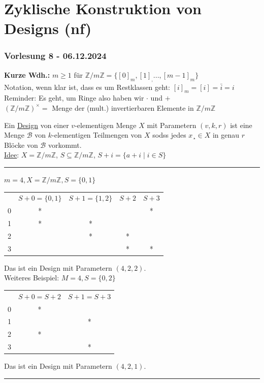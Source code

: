 \documentclass[9pt]{article}
\begin{document}
\section{Zyklische Konstruktion von Designs (nf)}
\subsubsection*{Vorlesung 8 - 06.12.2024}
\textbf{Kurze Wdh.:} $m \geq 1$ für $\mathbb{Z} / m \mathbb{Z} = \{[0]_m, [1]_, ..., [m-1]_m\}$ \\
Notation, wenn klar ist, dass es um Restklassen geht: $[i]_m = [i] = \bar{i} = i$ \\
Reminder: Es geht, um Ringe also haben wir $\cdot$ und $+$ \\
$(\mathbb{Z} / m \mathbb{Z})^{\times} = $ Menge der (mult.) invertierbaren Elemente in $\mathbb{Z} / m \mathbb{Z}$

Ein \underline{Design} von einer $v$-elementigen Menge $X$ mit Parametern $(v,k,r)$ ist eine Menge $\mathcal{B}$ von $k$-elementigen Teilmengen von $X$ sodss jedes $x ¸\in X$ in genau $r$ Blöcke von $\mathcal{B}$ vorkommt. \\
\underline{Idee}: $X = \mathbb{Z} / m \mathbb{Z}$, $S \subseteq \mathbb{Z} / m \mathbb{Z}$, $S+i = \{ a+i \mid i \in S\}$ \\
 \noindent \rule{8cm}{0.4pt} 
\begin{bsp}
$ m = 4, X = \mathbb{Z} / m \mathbb{Z}, S = \{0,1\}$ 
\begin{table}[H]
    \centering
    \begin{tabular}{c|cccc}
         &  $S+0 = \{0,1\}$  & $S+1 = \{1,2\}$ & $S+2$ & $S+3$  \\
         0 & * & &  & * \\
         1 & * & * & & \\
         2 & & * & * & \\
         3 & & &  * & * \\
    \end{tabular}
\end{table} 
\noindent Das ist ein Design mit Parametern $(4,2,2)$. \\ \newline
Weiteres Beispiel: $ M = 4, S = \{0,2\}$
\begin{table}[H]
    \centering
    \begin{tabular}{c|cc}
         &  $S+0 = S+2$ & $S+1 = S+3$  \\
         0 & * &   \\
         1 & & *  \\
         2 &  * & \\
         3 & & *  \\
    \end{tabular}
\end{table}
\noindent Das ist ein Design mit Parametern $(4,2,1)$. 
\end{bsp} \noindent \rule{8cm}{0.4pt}
\end{document}
